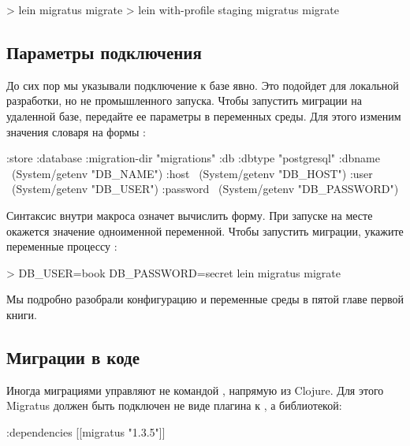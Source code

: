 \begin{english}
  \begin{bash}
> lein migratus migrate
> lein with-profile staging migratus migrate
  \end{bash}
\end{english}

\subsection{Параметры подключения}

До сих пор мы указывали подключение к базе явно. Это подойдет для локальной разработки, но не промышленного запуска. Чтобы запустить миграции на удаленной базе, передайте ее параметры в переменных среды. Для этого изменим значения словаря  на формы :

\begin{english}
  \begin{clojure}
{:store :database
 :migration-dir "migrations"
 :db {:dbtype "postgresql"
      :dbname ~(System/getenv "DB_NAME")
      :host ~(System/getenv "DB_HOST")
      :user ~(System/getenv "DB_USER")
      :password ~(System/getenv "DB_PASSWORD")}}
  \end{clojure}
\end{english}

Синтаксис  внутри макроса  означет вычислить форму. При запуске  на месте  окажется значение одноименной переменной. Чтобы запустить миграции, укажите переменные процессу :

\begin{english}
  \begin{bash}
> DB_USER=book DB_PASSWORD=secret lein migratus migrate
  \end{bash}
\end{english}

Мы подробно разобрали конфигурацию и переменные среды в пятой главе первой книги.

\subsection{Миграции в коде}

Иногда миграциями управляют не командой , напрямую из Clojure. Для этого Migratus должен быть подключен не виде плагина к , а библиотекой:

\begin{english}
  \begin{clojure}
{:dependencies [[migratus "1.3.5"]]}
  \end{clojure}
\end{english}

